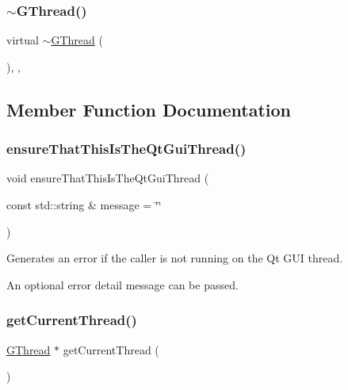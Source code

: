 \subsubsection{\texorpdfstring{$\sim$\+G\+Thread()}{~GThread()}}
{\footnotesize\ttfamily virtual $\sim$\mbox{\hyperlink{classsgl_1_1GThread}{G\+Thread}} (\begin{DoxyParamCaption}{ }\end{DoxyParamCaption})\hspace{0.3cm}{\ttfamily [protected]}, {\ttfamily [virtual]}, {\ttfamily [default]}}



\subsection{Member Function Documentation}
\mbox{\label{classsgl_1_1GThread_a27a1f5f9657637e4a4b6a7127ca9da33}} 
\subsubsection{\texorpdfstring{ensure\+That\+This\+Is\+The\+Qt\+Gui\+Thread()}{ensureThatThisIsTheQtGuiThread()}}
{\footnotesize\ttfamily void ensure\+That\+This\+Is\+The\+Qt\+Gui\+Thread (\begin{DoxyParamCaption}\item[{const std\+::string \&}]{message = {\ttfamily \char`\"{}\char`\"{}} }\end{DoxyParamCaption})\hspace{0.3cm}{\ttfamily [static]}}



Generates an error if the caller is not running on the Qt G\+UI thread. 

An optional error detail message can be passed. \mbox{\label{classsgl_1_1GThread_aaa459934e7c2be37d30ed64ab5dd8dbe}} 
\subsubsection{\texorpdfstring{get\+Current\+Thread()}{getCurrentThread()}}
{\footnotesize\ttfamily \mbox{\hyperlink{classsgl_1_1GThread}{G\+Thread}} $\ast$ get\+Current\+Thread (\begin{DoxyParamCaption}{ }\end{DoxyParamCaption})\hspace{0.3cm}{\ttfamily [static]}}



